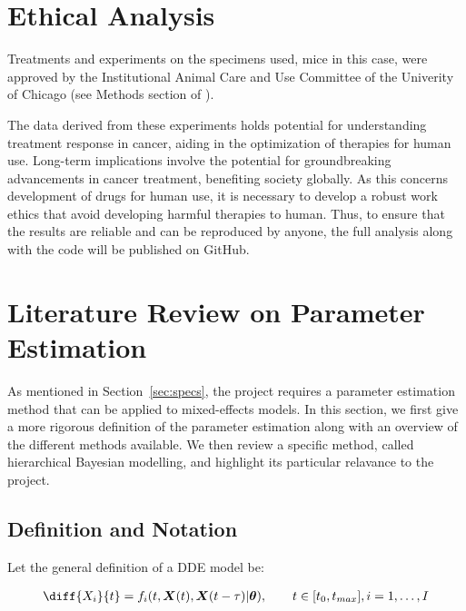 \documentclass[11pt]{article}
\begin{document}
\section{Ethical Analysis}

Treatments and experiments on the specimens used, mice in this case, were approved by the Institutional Animal Care and Use Committee of the Univerity of Chicago (see Methods section of \cite{cbdil12}).

The data derived from these experiments holds potential for understanding treatment response in cancer, aiding in the optimization of therapies for human use. Long-term implications involve the potential for groundbreaking advancements in cancer treatment, benefiting society globally. As this concerns development of drugs for human use, it is necessary to develop a robust work ethics that avoid developing harmful therapies to human. Thus, to ensure that the results are reliable and can be reproduced by anyone, the full analysis along with the code will be published on GitHub.

\section{Literature Review on Parameter Estimation}\label{sec:littrev}

As mentioned in Section~\ref{sec:specs}, the project requires a parameter estimation method that can be applied to mixed-effects models. In this section, we first give a more rigorous definition of the parameter estimation along with an overview of the different methods available. We then review a specific method, called hierarchical Bayesian modelling, and highlight its particular relavance to the project. 

\subsection{Definition and Notation}
Let the general definition of a DDE model be: 

\begin{align*}
    \diff{X_i}{t} = f_i(t, \boldsymbol{X}(t), \boldsymbol{X}(t-\tau)| \boldsymbol{\theta}), \qquad t \in [t_0, t_{max}], i = 1, \ldots, I
\end{align*}
\end{document}

